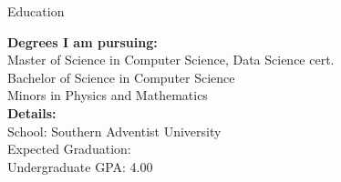 
\begin{rSection}{Education}
  \begin{vwcol}[widths={0.59,0.41},
      sep=0.2cm, justify=flush,rule=0pt,indent=1em]
    {\bf\small Degrees I am pursuing:}\\
    Master of Science in Computer Science, Data Science cert.\\
    Bachelor of Science in Computer Science\\
    Minors in Physics and Mathematics\\
    {\bf\small Details:}\\
    School: {Southern Adventist University}\\
    Expected Graduation: \\
    Undergraduate GPA: {4.00}
  \end{vwcol}
\end{rSection}

